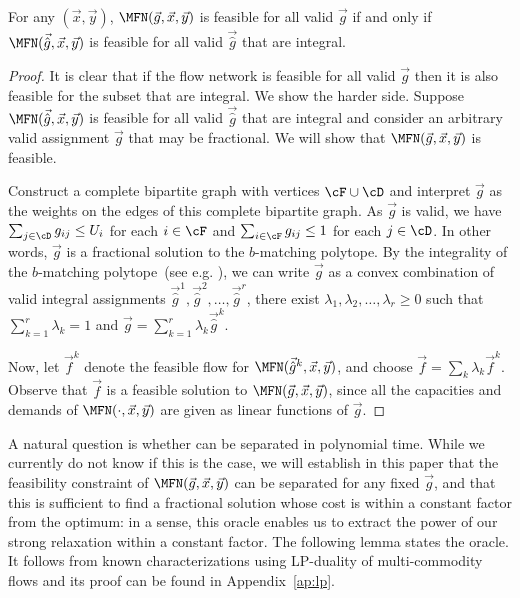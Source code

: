 \begin{lemma}
\label{lem:bing}
For any $(\vec{x}, \vec{y})$, $\MFN(\vec{g}, \vec{x}, \vec{y})$ is feasible for all valid $\vec{g}$
if and only if $\MFN(\vec{\hat g}, \vec{x}, \vec{y})$ is feasible for all valid $\vec{\hat g}$  that
are integral.
\end{lemma}
\begin{proof}
  It is clear that if the flow network is feasible for all valid $\vec{g}$ then it is also feasible
  for the subset that are integral. We  show the harder side. Suppose $\MFN(\vec{\hat g}, \vec{x},
  \vec{y})$ is feasible for all valid $\vec{\hat g}$  that are integral and consider an arbitrary valid assignment $\vec{g}$
  that may be fractional. We will show that $\MFN(\vec{g}, \vec{x}, \vec{y})$ is feasible.

  Construct a complete bipartite graph with vertices $\cF \cup \cD$ and interpret $\vec{g}$ as the
 weights on the edges of this complete bipartite graph. As $\vec{g}$ is valid, we have $\sum_{j\in \cD}
  g_{ij} \leq U_i$ for each $i\in \cF$ and
  $\sum_{i\in \cF} g_{ij} \leq 1$ for each $j\in \cD$. In other words, $\vec{g}$ is a fractional
  solution to the $b$-matching polytope.  By the integrality of the $b$-matching polytope~(see e.g. \cite{S2003}),  we
  can write $\vec{g}$ as a convex combination of valid integral assignments $\vec{\hat g}^1, \vec{\hat
    g}^2, \ldots, \vec{\hat g}^r$, \ie there exist $\lambda_1, \lambda_2, \ldots, \lambda_r \geq
  0$ such that $\sum_{k=1}^r \lambda_k = 1$ and $\vec{g} = \sum_{k=1}^r \lambda_k\vec{\hat g}^k$.

  Now, let $\vec f^k$ denote the feasible flow for $\MFN(\vec{\hat g}^k,
  \vec{x},\vec{y})$, and choose $\vec f=\sum_{k} \lambda_k \vec f^k$. Observe that $\vec f$ is a feasible solution to $\MFN(\vec{g}, \vec{x}, \vec{y})$, since all the capacities and demands of $\MFN(\cdot,\vec x,\vec y)$ are given as linear functions of $\vec g$.
\end{proof}


A natural question is whether \MFNLP can be separated in polynomial time. While we currently do not
know if this is the case, we will establish in this paper that the feasibility constraint of
$\MFN(\vec { g},\vec x,\vec y)$ can be separated for any fixed $\vec{ g}$, and that this is
sufficient to find a fractional solution whose cost is within a constant factor from the optimum: in
a sense, this oracle enables us to extract the power of our strong relaxation within a constant
factor. The following lemma states the oracle. It follows from known characterizations using
LP-duality of multi-commodity flows and its proof can be found in Appendix~\ref{ap:lp}.


